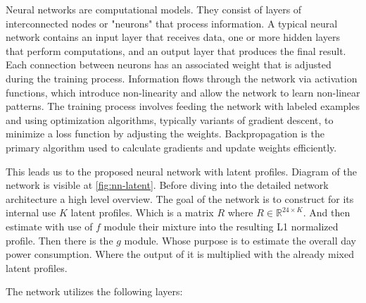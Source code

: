 Neural networks are computational models. They consist of layers of interconnected nodes or "neurons" that process information. A typical neural network contains an input layer that receives data, one or more hidden layers that perform computations, and an output layer that produces the final result. Each connection between neurons has an associated weight that is adjusted during the training process. Information flows through the network via activation functions, which introduce non-linearity and allow the network to learn non-linear patterns. The training process involves feeding the network with labeled examples and using optimization algorithms, typically variants of gradient descent, to minimize a loss function by adjusting the weights. Backpropagation is the primary algorithm used to calculate gradients and update weights efficiently.


This leads us to the proposed neural network with latent profiles. Diagram of the network is visible at \ref{fig:nn-latent}. Before diving into the detailed network architecture a high level overview. The goal of the network is to construct for its internal use $K$  latent profiles. Which is a matrix $R$ where $R \in \mathbb{R}^{24 \times K}$. And then estimate with use of $f$ module their mixture into the resulting L1 normalized profile. Then there is the $g$ module. Whose purpose is to estimate the overall day power consumption. Where the output of it is multiplied with the already mixed latent profiles.

\newpage

The network utilizes the following layers:

\newcommand{\nnmodule}[3]{%
    \begin{marginfigure}[1cm]
        \centering
        \texttt{[image: \#2]}
    \end{marginfigure}
    \item \textbf{#1} \\
    #3
    \vspace{2mm}
}


